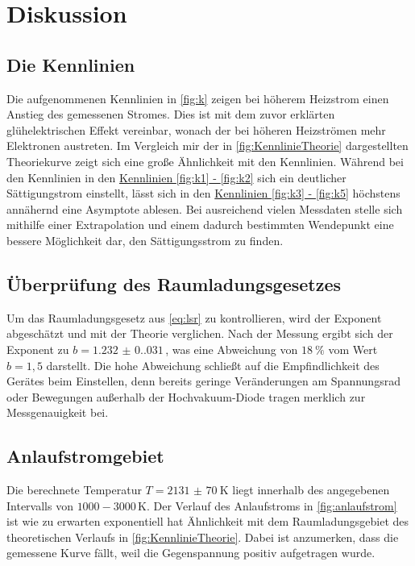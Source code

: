 \section{Diskussion}
\label{sec:Diskussion}

\subsection{Die Kennlinien}
Die aufgenommenen Kennlinien in \autoref{fig:k} zeigen bei höherem Heizstrom einen Anstieg des gemessenen Stromes.
Dies ist mit dem zuvor erklärten glühelektrischen Effekt vereinbar, wonach der bei höheren Heizströmen mehr Elektronen austreten.
Im Vergleich mir der in \autoref{fig:KennlinieTheorie} dargestellten Theoriekurve zeigt sich eine große Ähnlichkeit mit den Kennlinien.
Während bei den Kennlinien in den \hyperref[fig:k]{Kennlinien \ref{fig:k1} - \ref{fig:k2}} sich ein deutlicher Sättigungstrom einstellt,
lässt sich in den \hyperref[fig:k]{Kennlinien \ref{fig:k3} - \ref{fig:k5}} höchstens annähernd eine Asymptote ablesen.
Bei ausreichend vielen Messdaten stelle sich mithilfe einer Extrapolation und einem dadurch bestimmten Wendepunkt eine bessere Möglichkeit dar,
den Sättigungsstrom zu finden.

\subsection{Überprüfung des Raumladungsgesetzes}
Um das Raumladungsgesetz aus \autoref{eq:lsr} zu kontrollieren, wird der Exponent abgeschätzt und mit der Theorie verglichen.
Nach der Messung ergibt sich der Exponent zu $b = \num{1.232(0.031)} \,$, 
was eine Abweichung von $\qty{18}{\percent}$ vom Wert $b = 1,5$ darstellt.
Die hohe Abweichung schließt auf die Empfindlichkeit des Gerätes beim Einstellen, denn bereits
geringe Veränderungen am Spannungsrad oder Bewegungen außerhalb der Hochvakuum-Diode tragen merklich zur Messgenauigkeit bei.

\subsection{Anlaufstromgebiet}
Die berechnete Temperatur $T = \qty{2131(70)}{\kelvin}$ liegt innerhalb des angegebenen Intervalls von $1000 - 3000 \, \mathrm{K}$. 
Der Verlauf des Anlaufstroms in \autoref{fig:anlaufstrom} ist wie zu erwarten exponentiell
hat Ähnlichkeit mit dem Raumladungsgebiet des theoretischen Verlaufs in \autoref{fig:KennlinieTheorie}.
Dabei ist anzumerken, dass die gemessene Kurve fällt, weil die Gegenspannung positiv aufgetragen wurde.

